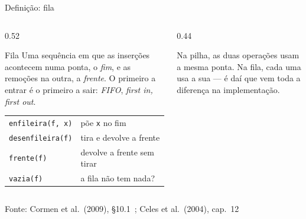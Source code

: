 \documentclass[aspectratio=169]{beamer}
\newcommand{\fila}[3]{%
  \foreach \e [count=\k from 0] in {#3} {
    \node[cel] at (#1+0.55*\k, #2) {\e};
  }
}
\newcommand{\fonte}[1]{\vfill\hfill{\scriptsize\textcolor{UFSGray}{Fonte: #1}}}
\begin{document}
\begin{frame}{Definição: fila}
  \begin{columns}[c]
    \begin{column}{0.52\textwidth}
      \begin{block}{Fila}
        \small Uma sequência em que as inserções acontecem numa ponta, o
        \emph{fim}, e as remoções na outra, a \emph{frente}. O primeiro a
        entrar é o primeiro a sair: \emph{FIFO}, \emph{first in, first out}.
      \end{block}
      \small
      \begin{tabular}{@{}ll@{}}
        \texttt{enfileira(f, x)} & põe \texttt{x} no fim\\
        \texttt{desenfileira(f)} & tira e devolve a frente\\
        \texttt{frente(f)}       & devolve a frente sem tirar\\
        \texttt{vazia(f)}        & a fila não tem nada?
      \end{tabular}
    \end{column}
    \begin{column}{0.44\textwidth}
      \begin{center}
      \end{center}
      \small Na pilha, as duas operações usam a mesma ponta. Na fila, cada
      uma usa a sua --- é daí que vem toda a diferença na implementação.
    \end{column}
  \end{columns}
  \fonte{Cormen et al.\ (2009), §10.1~\cite{cormen2009introduction};
    Celes et al.\ (2004), cap.~12~\cite{celes2004introducao}}
\end{frame}
\end{document}
